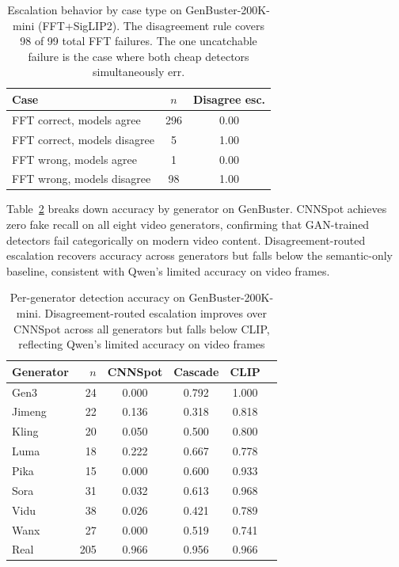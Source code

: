 \documentclass{ieeeaccess}
\begin{document}
\begin{table}[h]
\centering
\caption{Escalation behavior by case type on GenBuster-200K-mini (FFT+SigLIP2).
The disagreement rule covers 98 of 99 total FFT failures. The one uncatchable failure
is the case where both cheap detectors simultaneously err.}
\label{tab:escalation}
\begin{tabular}{lcc}
\toprule
Case & $n$ & Disagree esc. \\
\midrule
FFT correct, models agree    & 296 & 0.00 \\
FFT correct, models disagree &   5 & 1.00 \\
FFT wrong, models agree      &   1 & 0.00 \\
FFT wrong, models disagree   &  98 & 1.00 \\
\bottomrule
\end{tabular}
\end{table}

Table~\ref{tab:per_generator} breaks down accuracy by generator on GenBuster.
CNNSpot achieves zero fake recall on all eight video generators, confirming that
GAN-trained detectors fail categorically on modern video content. Disagreement-routed
escalation recovers accuracy across generators but falls below the semantic-only
baseline, consistent with Qwen's limited accuracy on video frames.


\begin{table}[h]
\centering
\caption{Per-generator detection accuracy on GenBuster-200K-mini. Disagreement-routed
escalation improves over CNNSpot across all generators but falls below CLIP, reflecting
Qwen's limited accuracy on video frames}
\label{tab:per_generator}
\begin{tabular}{lrcccc}
\toprule
Generator & $n$ & CNNSpot & Cascade & CLIP \\
\midrule
Gen3   & 24  & 0.000 & 0.792 & 1.000 \\
Jimeng & 22  & 0.136 & 0.318 & 0.818 \\
Kling  & 20  & 0.050 & 0.500 & 0.800 \\
Luma   & 18  & 0.222 & 0.667 & 0.778 \\
Pika   & 15  & 0.000 & 0.600 & 0.933 \\
Sora   & 31  & 0.032 & 0.613 & 0.968 \\
Vidu   & 38  & 0.026 & 0.421 & 0.789 \\
Wanx   & 27  & 0.000 & 0.519 & 0.741 \\
\midrule
Real   & 205 & 0.966 & 0.956 & 0.966 \\
\bottomrule
\end{tabular}
\end{table}
\end{document}
